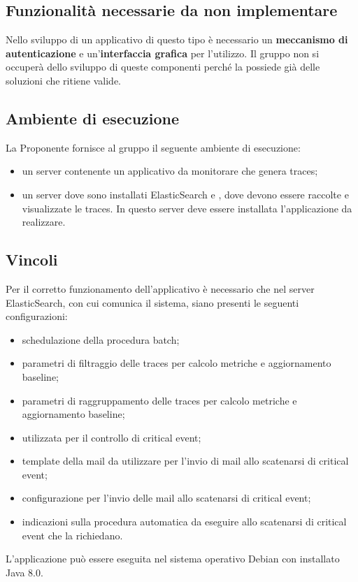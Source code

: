    	\subsection{Funzionalità necessarie da non implementare} \label{funzioni non richieste}
   	
   		Nello sviluppo di un applicativo di questo tipo è necessario un \textbf{meccanismo di autenticazione} e
   		un'\textbf{interfaccia grafica} per l'utilizzo. Il gruppo non si occuperà dello sviluppo di queste
   		componenti perché la  possiede già delle soluzioni che
   		ritiene valide.

    \subsection{Ambiente di esecuzione}

    	La Proponente \Proponente{} fornisce al gruppo \GroupName{} il seguente ambiente di esecuzione:

    		\begin{itemize}
    			\item un server contenente un applicativo da monitorare che genera traces;
    			\item un server dove sono installati ElasticSearch e , dove devono essere raccolte e visualizzate le traces. In 							questo server deve essere installata l'applicazione da realizzare.
    		\end{itemize}

    \subsection{Vincoli} \label{vincoli}

        Per il corretto funzionamento dell'applicativo è necessario che nel server ElasticSearch, con cui comunica
        il sistema, siano presenti le seguenti configurazioni:

            \begin{itemize}
                \item schedulazione della procedura batch;
                \item parametri di filtraggio delle traces per calcolo metriche e aggiornamento baseline;
                \item parametri di raggruppamento delle traces per calcolo metriche e aggiornamento baseline;
                \item {} utilizzata per il controllo di critical event;
                \item template della mail da utilizzare per l'invio di mail allo scatenarsi di critical event;
                \item configurazione per l'invio delle mail allo scatenarsi di critical event;
                \item indicazioni sulla procedura automatica da eseguire allo scatenarsi di critical event che
                la richiedano.
            \end{itemize}

        L'applicazione può essere eseguita nel sistema operativo Debian con installato Java 8.0.
